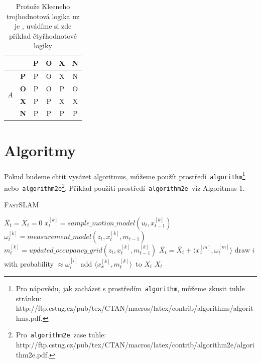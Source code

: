 \documentclass[a4paper, 11pt]{article}
\begin{document}
\begin{table}[ht]
\begin{center}
\begin{tabular}{| c  c | c | c | c | c |}
            & & \textbf{P} & \textbf{O} & \textbf{X} & \textbf{N} \\ \hline
            \multirow{4}{*}{$A$} & \multicolumn{1}{|c|}{\textbf{P}} & P & O & X & N \\ \cline{2-6}
            & \multicolumn{1}{|c|}{\textbf{O}} & P & O & P & O \\ \cline{2-6}
            & \multicolumn{1}{|c|}{\textbf{X}} & P & P & X & X \\ \cline{2-6}
            & \multicolumn{1}{|c|}{\textbf{N}} & P & P & P & P \\ \hline
        \end{tabular}  
    \caption{Protože Kleeneho trojhodnotová logika uz je , uvádíme si zde příklad čtyřhodnotové logiky}
    \end{center}
    
\end{table}

\section{Algoritmy}

Pokud budeme chtít vysázet algoritmus, můžeme použít prostředí\texttt{ algorithm}\footnote{Pro nápovědu, jak zacházet s prostředím\texttt{ algorithm}, můžeme zkusit tuhle stránku:\\ http://ftp.cstug.cz/pub/tex/CTAN/macros/latex/contrib/algorithms/algorithms.pdf.}\;\; nebo\texttt{ algorithm2e}\footnote{Pro \,\texttt{algorithm2e}\, zase tuhle:
http://ftp.cstug.cz/pub/tex/CTAN/macros/latex/contrib/algorithm2e/algorithm2e.pdf.}.
Příklad použití prostředí\texttt{ algorithm2e }viz Algoritmus 1.

\SetAlgoNoLine
\LinesNumbered
\SetNlSty{}{}{:}
\IncMargin{1.5em}

\begin{algorithm}
\caption{\textsc{FastSLAM}}
\DontPrintSemicolon
\Indm{}
\Indp
\BlankLine
$\overline{X_t}=X_t=0$\;
{
    $x_t^{[k]} = sample\_motion\_model(u_t, x_{t-1}^{[k]})$\;
    $\omega_t^{[k]} = measurement\_model(z_t, x_t^{[k]}, m_{t-1})$\;
    $m_t^{[k]} = updated\_occupancy\_grid(z_t, x_t^{[k]}, m_{t-1}^{[k]})$\;
    $\overline{X_t} = \overline{X_t} + \langle x_x^{[m]}, \omega_t^{[m]}\rangle$\;
}
{
    draw $i$ with probability $\approx \omega_i^{[i]}$\;
    add $\langle x_x^{[k]}, m_t^{[k]}\rangle$\ to $X_t$\;
}
\Return $X_t$
\end{algorithm}
\end{document}

